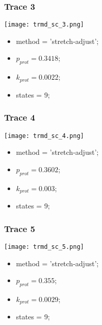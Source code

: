 \subsubsection{Trace 3}
\begin{minipage}[c]{0.7\textwidth}
    \texttt{[image: trmd\_sc\_3.png]}
\end{minipage}
\hfill
\begin{minipage}[c]{0.45\textwidth}
    \begin{itemize}
        \item method = 'stretch-adjust';
        \item $p_{prot}=0.3418$;
        \item $k_{prot}=0.0022$;
        \item states = 9;
    \end{itemize}
\end{minipage}

\subsubsection{Trace 4}
\begin{minipage}[c]{0.7\textwidth}
    \texttt{[image: trmd\_sc\_4.png]}
\end{minipage}
\hfill
\begin{minipage}[c]{0.45\textwidth}
    \begin{itemize}
        \item method = 'stretch-adjust';
        \item $p_{prot}=0.3602$;
        \item $k_{prot}=0.003$;
        \item states = 9;
    \end{itemize}
\end{minipage}

\subsubsection{Trace 5}
\begin{minipage}[c]{0.7\textwidth}
    \texttt{[image: trmd\_sc\_5.png]}
\end{minipage}
\hfill
\begin{minipage}[c]{0.45\textwidth}
    \begin{itemize}
        \item method = 'stretch-adjust';
        \item $p_{prot}=0.355$;
        \item $k_{prot}=0.0029$;
        \item states = 9;
    \end{itemize}
\end{minipage}


